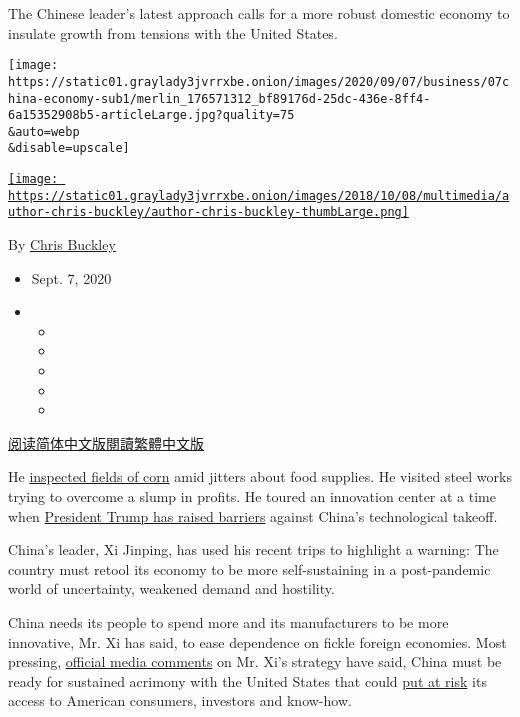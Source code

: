 The Chinese leader's latest approach calls for a more robust domestic
economy to insulate growth from tensions with the United States.

\texttt{[image: https://static01.graylady3jvrrxbe.onion/images/2020/09/07/business/07china-economy-sub1/merlin\_176571312\_bf89176d-25dc-436e-8ff4-6a15352908b5-articleLarge.jpg?quality=75\\\&auto=webp\\\&disable=upscale]}

\href{https://www.nytimes3xbfgragh.onion/by/chris-buckley}{\texttt{[image: https://static01.graylady3jvrrxbe.onion/images/2018/10/08/multimedia/author-chris-buckley/author-chris-buckley-thumbLarge.png]}}

By \href{https://www.nytimes3xbfgragh.onion/by/chris-buckley}{Chris
Buckley}

\begin{itemize}
\item
  Sept. 7, 2020
\item
  \begin{itemize}
  \item
  \item
  \item
  \item
  \item
  \end{itemize}
\end{itemize}

\href{https://cn.nytimes3xbfgragh.onion/business/20200908/china-xi-economy/}{阅读简体中文版}\href{https://cn.nytimes3xbfgragh.onion/business/20200908/china-xi-economy/zh-hant/}{閱讀繁體中文版}

He
\href{http://www.xinhuanet.com/politics/leaders/2020-07/24/c_1126281973.htm}{inspected
fields of corn} amid jitters about food supplies. He visited steel works
trying to overcome a slump in profits. He toured an innovation center at
a time when
\href{https://www.nytimes3xbfgragh.onion/2019/10/23/business/trump-technology-china-trade.html}{President
Trump has raised barriers} against China's technological takeoff.

China's leader, Xi Jinping, has used his recent trips to highlight a
warning: The country must retool its economy to be more self-sustaining
in a post-pandemic world of uncertainty, weakened demand and hostility.

China needs its people to spend more and its manufacturers to be more
innovative, Mr. Xi has said, to ease dependence on fickle foreign
economies. Most pressing,
\href{http://news.youth.cn/sz/202008/t20200804_12436479.htm}{official
media comments} on Mr. Xi's strategy have said, China must be ready for
sustained acrimony with the United States that could
\href{http://sky.cssn.cn/skyskl/skyskl_jczx/202008/t20200826_5174247.shtml}{put
at risk} its access to American consumers, investors and know-how.


